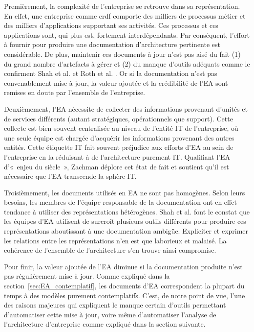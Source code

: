 Premièrement, la complexité de l'entreprise se retrouve dans sa
représentation. En effet, une entreprise comme \gls{erdf} comporte des milliers
de processus métier et des milliers d'applications supportant ses activités.
Ces processus et ces applications sont, qui plus est, fortement
interdépendants. Par conséquent, l'effort à fournir pour produire une
documentation d'architecture pertinente est considérable. De plus, maintenir
ces documents à jour n'est pas aisé du fait (1) du grand nombre d'artefacts à
gérer et (2) du manque d'outils adéquats comme le confirment Shah et al.
\cite{shah2007frameworks} et Roth et al. \cite{roth2013enterprise}. Or si la
documentation n'est pas convenablement mise à jour, la valeur ajoutée et la
crédibilité de l'EA sont remises en doute par l'ensemble de l'entreprise.

Deuxièmement, l'EA nécessite de collecter des informations provenant
d'unités et de services différents (autant stratégiques, opérationnels que
support). Cette collecte est bien souvent centralisée au niveau de l'entité IT
de l'entreprise, où une seule équipe est chargée d'acquérir les informations
provenant des autres entités. Cette étiquette IT fait souvent préjudice aux
efforts d'EA au sein de l'entreprise en la réduisant à de l'architecture
purement IT. Qualifiant l'EA d'«~enjeu du siècle~», Zachman déplore cet état de
fait et soutient qu'il est nécessaire que l'EA transcende la sphère IT.


Troisièmement, les documents utilisés en EA ne sont pas homogènes. Selon
leurs besoins, les membres de l'équipe responsable de la documentation ont en
effet tendance à utiliser des représentations hétérogènes. Shah et al.
\cite{shah2007frameworks} font le constat que les équipes d'EA utilisent de
surcroît plusieurs outils différents pour produire ces représentations
aboutissant à une documentation ambigüe. Expliciter et exprimer les relations
entre les représentations n'en est que laborieux et malaisé. La cohérence de
l'ensemble de l'architecture s'en trouve ainsi compromise.

 Pour finir, la valeur ajoutée de l'EA diminue si la documentation produite
n'est pas régulièrement mise à jour. Comme expliqué dans la
section~\ref{sec:EA_contemplatif}, les documents d'EA correspondent la plupart
du temps à des modèles purement contemplatifs. C'est, de notre point de vue,
l'une des raisons majeures qui expliquent le manque certain d'outils permettant
d'automatiser cette mise à jour, voire même d'automatiser l'analyse de
l'architecture d'entreprise comme expliqué dans la section suivante.



